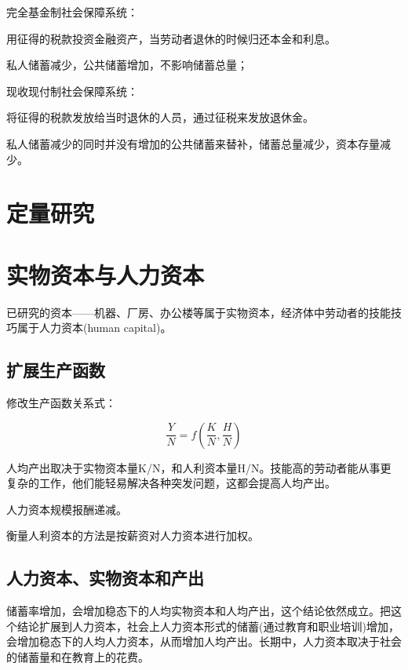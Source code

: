 \documentclass{article}
\begin{document}
\hspace*{\fill}

完全基金制社会保障系统：

用征得的税款投资金融资产，当劳动者退休的时候归还本金和利息。

私人储蓄减少，公共储蓄增加，不影响储蓄总量；

\hspace*{\fill}

现收现付制社会保障系统：

将征得的税款发放给当时退休的人员，通过征税来发放退休金。

私人储蓄减少的同时并没有增加的公共储蓄来替补，储蓄总量减少，资本存量减少。

\section{定量研究}


\section{实物资本与人力资本}

已研究的资本——机器、厂房、办公楼等属于实物资本，经济体中劳动者的技能技巧属于人力资本(human capital)。


\subsection{扩展生产函数}

修改生产函数关系式：

\[
\frac{Y}{N}=f(\frac{K}{N},\frac{H}{N})
\]

人均产出取决于实物资本量K/N，和人利资本量H/N。技能高的劳动者能从事更复杂的工作，他们能轻易解决各种突发问题，这都会提高人均产出。

人力资本规模报酬递减。

衡量人利资本的方法是按薪资对人力资本进行加权。

\subsection{人力资本、实物资本和产出}

储蓄率增加，会增加稳态下的人均实物资本和人均产出，这个结论依然成立。把这个结论扩展到人力资本，社会上人力资本形式的储蓄(通过教育和职业培训)增加，会增加稳态下的人均人力资本，从而增加人均产出。长期中，人力资本取决于社会的储蓄量和在教育上的花费。

\hspace*{\fill}
\end{document}
